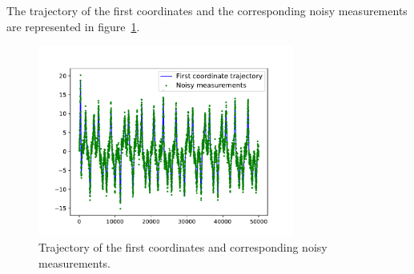 \documentclass[english, DIV=13]{scrartcl}
\begin{document}
The trajectory of the first coordinates and the corresponding noisy measurements
are represented in figure~\ref{fig:q2-mes-vs-real}.

\begin{figure}[ht]
    \centering
    \includegraphics[width=0.75\textwidth]{figures/q2-mes-vs-real}
    \caption{Trajectory of the first coordinates and corresponding noisy measurements.}
    \label{fig:q2-mes-vs-real}
\end{figure}
\end{document}
